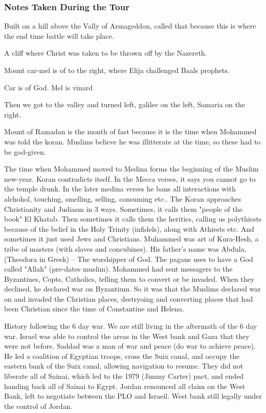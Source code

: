 \documentclass[letterpaper]{report}
\begin{document}
\subsubsection{Notes Taken During the Tour}
Built on a hill above the Vally of Armageddon, called that because this is where the end time battle will take place.

A cliff where Christ was taken to be thrown off by the Nazereth.

Mount car-mel is of to the right, where Elija challenged Baals prophets.

Car is of God.
Mel is vinard

Then we got to the valley and turned left, galilee on the left, Samaria on the right.

Mount of Ramadan is the month of fast because it is the time when Mohammed was told the koran.  Muslims believe he was illitterate at the time, so these had to be god-given.

The time when Mohammed moved to Medina forms the beginning of the Muslim new-year. 
Koran contradicts itself. In the Mecca verses, it says you cannot go to the temple drunk.  In the later medina verses he bans all interactions with alchohol, touching, smelling, selling, consuming etc..
The Koran approaches Christianity and Judiasm in 3 ways.
Sometimes, it calls them "people of the book" El Khatab.
Then sometimes it calls them the heritics, calling us polythiests because of the belief in the Holy Trinity (infidels), along with Athiests etc.
And sometimes it just used Jews and Christians.
Muhammed was art of Kura-Hesh, a tribe of masters (with slaves and concubines).
His father's name was Abdula, (Theodora in Greek) -- The worshipper of God. The pagans uses to have a God called "Allah" (pre-dates muslim). 
Mohammed had sent messagers to the Byzantines, Copts, Catholics, telling them to convert or be invaded.
When they declined, he declared war on Byzantium. So it was that the Muslims declared war on and invaded the Christian places, destryoing and converting places that had been Christian since the time of Constantine and Helena.

History following the 6 day war.
We are still living in the aftermath of the 6 day war.  Israel was able to control the areas in the West bank and Gaza that they were not before.
Saddad was a man of war and peace (do war to achieve peace). He led a coalition of Egyptian troops, cross the Suix canal, and occupy the eastern bank of the Suix canal, allowing navigation to resume. They did not liberate all of Sainai, which led to the 1979 (Jimmy Carter) pact, and ended handing back all of Sainai to Egypt.  Jordan renounced all claim on the West Bank, left to negotiate between the PLO and Israeil.  West bank still legally under the control of Jordan.
\end{document}
